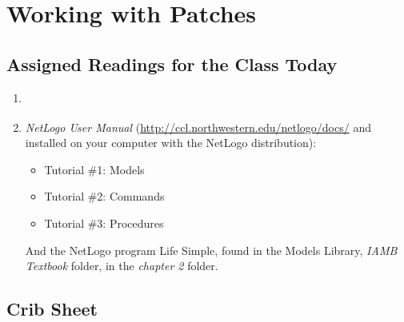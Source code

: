 \chapter{Working with Patches\label{ch:intro_patches}}

\setcounter{section}{-1}

\section{Assigned Readings for the Class Today}

\begin{enumerate}
\item \citet[chapter 2, pages 45--68]{wilensky_rand_2015}
\item {\it NetLogo User Manual} (\url{http://ccl.northwestern.edu/netlogo/docs/} and installed on
  your computer
  with the NetLogo distribution):
\begin{itemize}
\item Tutorial \#1: Models
\item Tutorial \#2: Commands
\item Tutorial \#3: Procedures
\end{itemize}
And the NetLogo program Life Simple, found in the Models Library, {\it IAMB Textbook} folder, in the {\it chapter 2} folder.
\end{enumerate}



\section{Crib Sheet}

